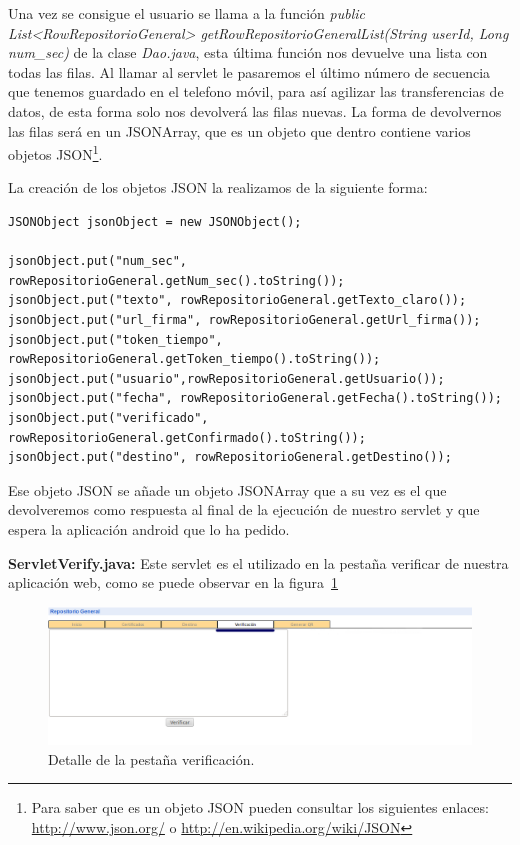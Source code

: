 \begin{description}
Una vez se consigue el usuario se llama a la función \textit{public List<RowRepositorioGeneral> getRowRepositorioGeneralList(String userId, Long num\_sec)} de la clase \textit{Dao.java}, esta última función nos devuelve una lista con todas las filas. Al llamar al servlet le pasaremos el último número de secuencia que tenemos guardado en el telefono móvil, para así agilizar las transferencias de datos, de esta forma solo nos devolverá las filas nuevas. La forma de devolvernos las filas será en un JSONArray, que es un objeto que dentro contiene varios objetos JSON\footnote{Para saber que es un objeto JSON pueden consultar los siguientes enlaces: \url{http://www.json.org/} o \url{http://en.wikipedia.org/wiki/JSON}}.

La creación de los objetos JSON la realizamos de la siguiente forma:
\begin{lstlisting}[style=Java]
JSONObject jsonObject = new JSONObject();

jsonObject.put("num_sec", rowRepositorioGeneral.getNum_sec().toString());
jsonObject.put("texto", rowRepositorioGeneral.getTexto_claro());
jsonObject.put("url_firma", rowRepositorioGeneral.getUrl_firma());
jsonObject.put("token_tiempo", rowRepositorioGeneral.getToken_tiempo().toString());
jsonObject.put("usuario",rowRepositorioGeneral.getUsuario());
jsonObject.put("fecha", rowRepositorioGeneral.getFecha().toString());
jsonObject.put("verificado", rowRepositorioGeneral.getConfirmado().toString());
jsonObject.put("destino", rowRepositorioGeneral.getDestino());
\end{lstlisting}

Ese objeto JSON se añade un objeto JSONArray que a su vez es el que devolveremos como respuesta al final de la ejecución de nuestro servlet y que espera la aplicación android que lo ha pedido.

\item \textbf{ServletVerify.java:} Este servlet es el utilizado en la pestaña verificar de nuestra aplicación web, como se puede observar en la figura~\ref{fig:pestanhaVerificar}

\begin{figure}
  \centering
    \includegraphics[scale=0.5]{./GoogleAppEngine/imagenes/pestanhaVerificar.png}
  \caption{Detalle de la pestaña verificación.}
  \label{fig:pestanhaVerificar}
\end{figure}


\end{description}

